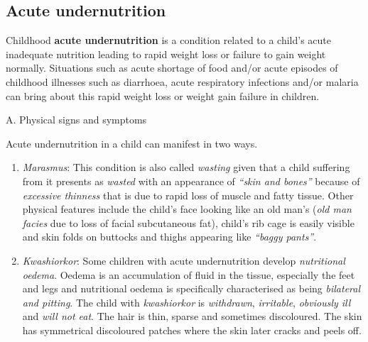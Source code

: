 \documentclass[12pt,]{book}
\theoremstyle{definition}
\theoremstyle{definition}
\theoremstyle{definition}
\theoremstyle{remark}
\begin{document}
\hypertarget{acute-undernutrition}{%
\subsection{Acute undernutrition}\label{acute-undernutrition}}

Childhood \textbf{acute undernutrition} is a condition related to a
child's acute inadequate nutrition leading to rapid weight loss or
failure to gain weight normally. Situations such as acute shortage of
food and/or acute episodes of childhood illnesses such as diarrhoea,
acute respiratory infections and/or malaria can bring about this rapid
weight loss or weight gain failure in children.

\newpage

A. Physical signs and symptoms

Acute undernutrition in a child can manifest in two ways.

\begin{enumerate}
\def\labelenumi{\arabic{enumi}.}
\item
  \emph{Marasmus}: This condition is also called \emph{wasting} given
  that a child suffering from it presents as \emph{wasted} with an
  appearance of \emph{``skin and bones''} because of \emph{excessive
  thinness} that is due to rapid loss of muscle and fatty tissue. Other
  physical features include the child's face looking like an old man's
  (\emph{old man facies} due to loss of facial subcutaneous fat),
  child's rib cage is easily visible and skin folds on buttocks and
  thighs appearing like \emph{``baggy pants''}.
\item
  \emph{Kwashiorkor}: Some children with acute undernutrition develop
  \emph{nutritional oedema}. Oedema is an accumulation of fluid in the
  tissue, especially the feet and legs and nutritional oedema is
  specifically characterised as being \emph{bilateral and pitting}. The
  child with \emph{kwashiorkor} is \emph{withdrawn}, \emph{irritable},
  \emph{obviously ill} and \emph{will not eat}. The hair is thin, sparse
  and sometimes discoloured. The skin has symmetrical discoloured
  patches where the skin later cracks and peels off.
\end{enumerate}
\end{document}
